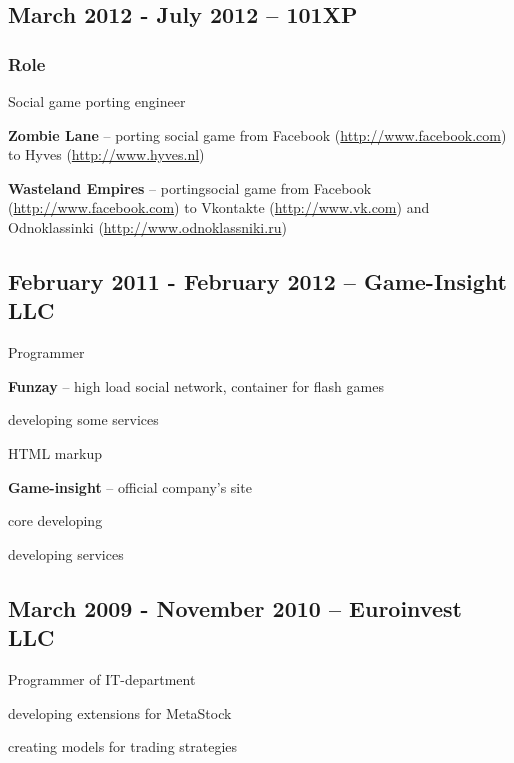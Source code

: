\documentclass[10pt, a4paper, english]{article}
\begin{document}
  \subsection* {March 2012 - July 2012 -- \textbf{101XP}}
    \subsubsection* {Role}
      Social game porting engineer
    \begin {list}{\textbullet}{}
      \item \textbf{Zombie Lane} -- porting social game from Facebook (\url{http://www.facebook.com}) to Hyves (\url{http://www.hyves.nl})
      \item \textbf{Wasteland Empires} -- portingsocial game from Facebook
        (\url{http://www.facebook.com}) to Vkontakte (\url{http://www.vk.com}) and Odnoklassinki (\url{http://www.odnoklassniki.ru})
    \end {list}

  \subsection* {February 2011 - February 2012 -- \textbf{Game-Insight LLC}}
    Programmer
    \begin {list}{\textbullet}{}
      \item \textbf{Funzay} -- high load social network, container for flash games
        \begin {list}{\textbullet}{}
          \item developing some services
          \item HTML markup 
        \end {list} 
      \item \textbf{Game-insight} -- official company's site
        \begin {list}{\textbullet}{}
          \item core developing
          \item developing services
        \end {list}
    \end {list}

  \subsection* {March 2009 - November 2010 -- \textbf{Euroinvest LLC}}
    Programmer of IT-department
    \begin {list}{\textbullet}{}
      \item developing extensions for MetaStock
      \item creating models for trading strategies
    \end {list}
\end{document}
